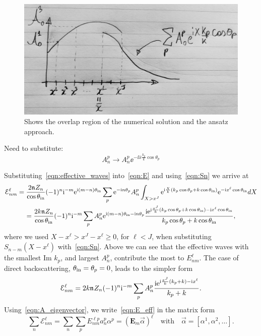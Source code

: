 \documentclass[12pt, a4paper]{article}
\begin{document}
\begin{figure}
  \centering
  \includegraphics[width=0.8\linewidth]{connect_effective.jpg}
  \caption{Shows the overlap region of the numerical solution and the ansatz approach.}
  \label{fig:connect_effective}
\end{figure}

Need to substitute:
\[
A^p_n \to  A^p_n \ee^{-\ii \bar x \frac{k_p}{k}\cos \theta_p}
\]


 Substituting~\eqref{eqn:effective_waves} into~\eqref{eqn:E} and using~\eqref{eqn:Sn} we arrive at
\begin{multline}
  \mathcal E_{nm}^\ell  = \frac{2 \mathfrak n_{} Z_n}{\cos \theta_{\mathrm{in}}} (-1)^n \textrm{i}^{-m} \textrm{e}^{\textrm{i} (m-n) \theta_{\mathrm{in}}}
   \sum_p \textrm{e}^{-\textrm{i} n \theta_p} A_{n}^p \int_{X> x^J} \textrm{e}^{\textrm{i} \frac{X}{k} (k_p \cos \theta_p + k \cos \theta_{\mathrm{in}})}
  \textrm{e}^{- \textrm{i} x^\ell\cos \theta_{\mathrm{in}}}
   dX
   \\
   = \frac{2 k \mathfrak n_{} Z_n }{\cos \theta_{\mathrm{in}}} (-1)^n \textrm{i}^{-m}
    \sum_p A_{n}^p \textrm{e}^{\textrm{i} (m-n) \theta_{\mathrm{in}} - \textrm{i} n \theta_p}
    \frac{\textrm{i} \textrm{e}^{\textrm{i}  \frac{x^J}{k} (k_p \cos \theta_p  + k  \cos \theta_{\mathrm{in}}) - \textrm{i}  x^\ell \cos \theta_{\mathrm{in}}}}
    {k_p \cos \theta_p + k\cos \theta_{\mathrm{in}}},
    \label{eqn:E_eff}
\end{multline}
where we used $ X -x^\ell > x^J - x^\ell \geq 0$, for $\ell < J$, when substituting $S_{n-m}(X-x^\ell)$ with~\eqref{eqn:Sn}. Above we can see that the effective waves with the smallest Im $k_p$, and largest $A_n^p$, contribute the most to $E_{nm}^\ell$. The case of direct backscattering, $\theta_{\mathrm{in}} = \theta_p =0$, leads to the simpler form
\begin{equation}
  \mathcal E_{nm}^\ell = 2 k \mathfrak n_{} Z_n (-1)^n \textrm{i}^{-m}
    \sum_p A_{n}^p
    \frac{\textrm{i} \textrm{e}^{\textrm{i}  \frac{x^J}{k} (k_p  + k ) - \textrm{i}  x^\ell}}{k_p + k}.
    \label{eqn:E_eff_direct}
\end{equation}
Using~\eqref{eqn:A_eigenvector}, we write~\eqref{eqn:E_eff} in the matrix form
\begin{equation}
  \sum_n \mathcal E_{nm}^\ell =  \sum_n\sum_p  E_{nm}^{\ell p} a_{n}^p \alpha^p = (\mathbf E_m \vec \alpha)^\ell \quad \text{with} \quad
  \vec \alpha = [\alpha^1, \alpha^2, \ldots].
    \label{eqn:E_eff_matrix}
\end{equation}
\end{document}

